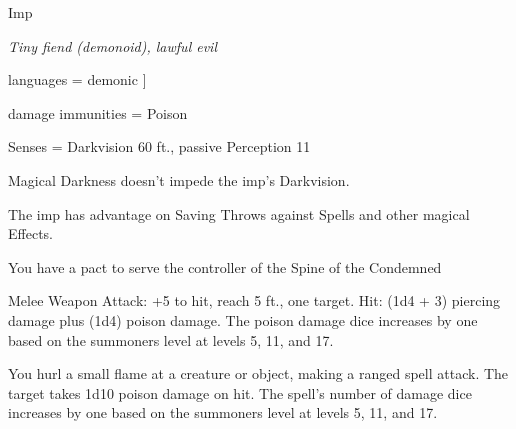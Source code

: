 \begin{monsterbox}{Imp}
	\begin{hangingpar}
		\textit{Tiny fiend (demonoid), lawful evil}
	\end{hangingpar}
	\dndline%
	\basics[armorclass = 13, hitpoints = 10 + summoners level, speed = 20 ft]
	\dndline%
	\stats[STR = \stat{6}, DEX = \stat{17}, CON = \stat{13}, INT = \stat{11}, WIS = \stat{12},	CHA = \stat{14}]
	\dndline
	languages = {demonic}
	]
	
	\dndline%
	damage immunities = Poison
		
	Senses = Darkvision 60 ft., passive Perception 11
	
	\dndline%
	\begin{monsteraction}
		Magical Darkness doesn't impede the imp's Darkvision.
	\end{monsteraction}	
	\begin{monsteraction}
		The imp has advantage on Saving Throws against Spells and other magical Effects.
	\end{monsteraction}	
	\begin{monsteraction}
		You have a pact to serve the controller of the Spine of the Condemned
	\end{monsteraction}	
	\begin{monsteraction}
		Melee Weapon Attack: +5 to hit, reach 5 ft., one target. Hit: (1d4 + 3) piercing damage plus (1d4) poison damage. The poison damage dice increases by one based on the summoners level at levels 5, 11, and 17.
	\end{monsteraction}	
	\begin{monsteraction}
		You hurl a small flame at a creature or object, making a ranged spell attack. The target takes 1d10 poison damage on hit. The spell's number of damage dice increases by one based on the summoners level at levels 5, 11, and 17.
	\end{monsteraction}	
\end{monsterbox}

